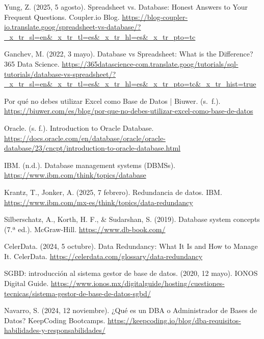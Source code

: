 \documentclass[12pt]{report}
\begin{document}
\begin{thebibliography}{99}
    Yung, Z. (2025, 5 agosto). Spreadsheet vs. Database: Honest Answers to Your Frequent Questions. Coupler.io Blog. \url{https://blog-coupler-io.translate.goog/spreadsheet-vs-database/?_x_tr_sl=en&_x_tr_tl=es&_x_tr_hl=es&_x_tr_pto=tc}

    Ganchev, M. (2022, 3 mayo). Database vs Spreadsheet: What is the Difference? 365 Data Science. \url{https://365datascience-com.translate.goog/tutorials/sql-tutorials/database-vs-spreadsheet/?_x_tr_sl=en&_x_tr_tl=es&_x_tr_hl=es&_x_tr_pto=tc&_x_tr_hist=true}

    Por qué no debes utilizar Excel como Base de Datos | Biuwer. (s. f.). \url{https://biuwer.com/es/blog/por-que-no-debes-utilizar-excel-como-base-de-datos}

    Oracle. (s. f.). Introduction to Oracle Database. \url{https://docs.oracle.com/en/database/oracle/oracle-database/23/cncpt/introduction-to-oracle-database.html}

    IBM. (n.d.). Database management systems (DBMSs). \url{https://www.ibm.com/think/topics/database}
    
    Krantz, T., Jonker, A. (2025, 7 febrero). Redundancia de datos. IBM. \url{https://www.ibm.com/mx-es/think/topics/data-redundancy}

    Silberschatz, A., Korth, H. F., \& Sudarshan, S. (2019). Database system concepts (7.ª ed.). McGraw-Hill. \url{https://www.db-book.com/}
    
    CelerData. (2024, 5 octubre). Data Redundancy: What It Is and How to Manage It. CelerData. \url{https://celerdata.com/glossary/data-redundancy}

    SGBD: introducción al sistema gestor de base de datos. (2020, 12 mayo). IONOS Digital Guide. \url{https://www.ionos.mx/digitalguide/hosting/cuestiones-tecnicas/sistema-gestor-de-base-de-datos-sgbd/}

    Navarro, S. (2024, 12 noviembre). ¿Qué es un DBA o Administrador de Bases de Datos? KeepCoding Bootcamps. \url{https://keepcoding.io/blog/dba-requisitos-habilidades-y-responsabilidades/}
\end{thebibliography}
\end{document}
